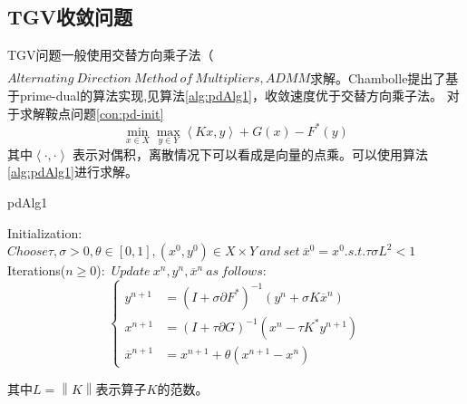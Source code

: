 \documentclass[UTF8]{ctexart}
\newcommand{\myciteup}[1]{\textsuperscript{\textsuperscript{\cite{#1}}}}
\begin{document}
\begin{sloppypar}
\subsection{TGV收敛问题}
    TGV问题一般使用交替方向乘子法（$Alternating\ Direction\ Method\ of\
    Multipliers, ADMM$求解。Chambolle\myciteup{Chambolle2011}提出了基于prime-dual的算法实现,见算法\ref{alg:pdAlg1}，收敛速度优于交替方向乘子法。
    对于求解鞍点问题\eqref{con:pd-init}
    \begin{equation}
        \min\limits_{x\in X} \max \limits_{y \in Y} \left< Kx,y \right> + G(x) - F^*(y)
        \label{con:pd-init}
    \end{equation}
    其中$\left< \cdot,\cdot \right>$ 表示对偶积，离散情况下可以看成是向量的点乘。可以使用算法\ref{alg:pdAlg1}进行求解。
    \begin{algorithm}
        \caption{pdAlg1}
        \begin{algorithmic}
            \STATE Initialization: $Choose \tau ,\sigma > 0,\theta \in [0,1],(x^0,y^0)\in X\times Y \ and \ set\ \overline{x}^0=x^0. s.t. \tau \sigma L^2<1$
            \STATE Iterations($n\geq 0$):\ $Update\ x^n,y^n,\overline{x}^n\ as\ follows:$
            \begin{equation}
                \left\{
                \begin{aligned}
                    y^{n+1} &= (I+\sigma \partial F^*)^{-1}(y^n+\sigma K\overline{x}^n)\\
                    x^{n+1} &= (I+\tau \partial G)^{-1}(x^n-\tau K^* y^{n+1})\\
                    \overline{x}^{n+1} &=x^{n+1} + \theta (x^{n+1}-x^n)
                \end{aligned}
                \right.
            \end{equation}
        \end{algorithmic}
        \label{alg:pdAlg1}
    \end{algorithm}
    其中$L=\left\| K \right\|$表示算子$K$的范数。\par


\end{sloppypar}
\end{document}
